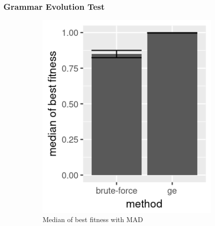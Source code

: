 \subsubsection{Grammar Evolution Test}
\begin{figure}
    \centering
    \begin{subfigure}{0.4\textwidth}
        \includegraphics[width=\textwidth]{figures/ge-random}
        \caption{Median of best fitness with MAD}
        \label{fig:ge-random}
    \end{subfigure}
    ~
    \begin{subfigure}{0.4\textwidth}

\end{subfigure}
\end{figure}
